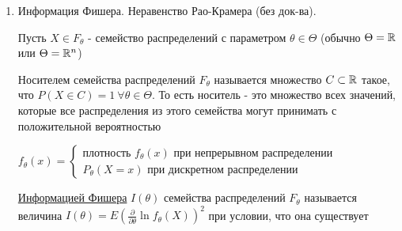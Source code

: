 \documentclass[12pt]{article}
\begin{document}
\begin{enumerate}
    и $L(\vec{X}, \theta) = f_\theta(x_1) \dots f_\theta(x_n) = \prod_{i = 1}^n f_\theta(x_i)$ в абсолютно непрерывном распределении

    \Defs Логарифмической функцией правдоподобия называется функция $\ln L(\vec{X}, \theta)$

    \Notas Так как $y = \ln x$ возврастающая функция, точки максимума совпадают, а такую функцию правдоподобия становится легче дифференцировать

    \Defs Оценкой максимального правдоподобия $\hat{\theta}$ называется значение $\theta$, при котором функция правдоподобия 
    $L(\vec{X}, \theta)$ достигает наибольшего значения (при фиксированных значениях выборки)

    \Ex Пусть $\vec{X} = (X_1, \dots, X_n)$ - выборка из распределения Пуассона $\Pi_\lambda$ с неизвестным $\lambda > 0$

    Для распределения Пуассона $P(X = x_i) = \frac{\lambda^{x_i}}{x_i!} e^{-\lambda}$. Получаем функцию максимального правдоподобия $L(\vec{X}, \lambda) = \frac{\lambda^{n \overline{x}}}{\prod_{i = 1}^n x_i!} e^{-n\lambda}$. Тогда $\ln L(\vec{X}, \lambda) = n \overline{x} \ln \lambda - \ln \prod_{i = 1}^n x_i! - n\lambda$
    
    $\frac{\partial \ln L}{\partial \lambda} = \frac{n \overline{x}}{\lambda} - n = 0 \Longrightarrow \hat{\lambda} = \overline{x}$ - оценка максимального правдоподобия
    
    \item Информация Фишера. Неравенство Рао-Крамера (без док-ва).

    Пусть $X \in F_\theta$ - семейство распределений с параметром $\theta \in \Theta$ (обычно $\Theta = \mathbb{R}$ или $\Theta = \mathbb{R}^n$)

    \Def Носителем семейства распределений $F_\theta$ называется множество $C \subset \mathbb{R}$
    такое, что $P(X \in C) = 1 \ \forall \theta \in \Theta$. То есть носитель - это множество всех значений, которые все распределения из этого семейства могут принимать с положительной вероятностью

    $f_\theta(x) = \begin{cases}
        \text{плотность } f_\theta(x) \text{ при непрерывном распределении} \\
        P_\theta(X = x) \text{ при дискретном распределении}
    \end{cases}$

    \Def \hyperlink{fishers_information}{Информацией Фишера} $I(\theta)$ семейства распределений $F_\theta$ называется величина 
    $I(\theta) = E\left(\frac{\partial}{\partial \theta} \ln f_\theta(X)\right)^2$ при условии, что
    она существует


\end{enumerate}
\end{document}
